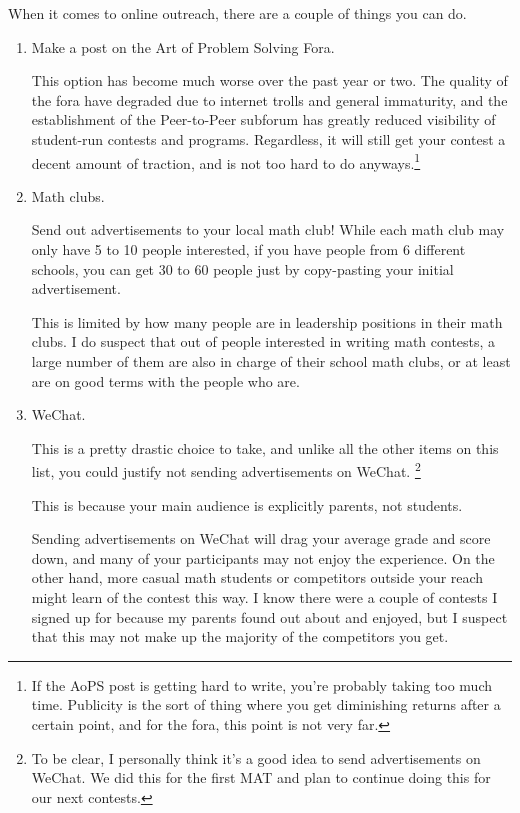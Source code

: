 \documentclass[points=false]{bounce}
\begin{document}
When it comes to online outreach, there are a couple of things you can do.
\begin{enumerate}
	\item Make a post on the Art of Problem Solving Fora.

					This option has become much worse over the past year or two. The quality of the fora have degraded due to internet trolls and general immaturity, and the establishment of the Peer-to-Peer subforum has greatly reduced visibility of student-run contests and programs. Regardless, it will still get your contest a decent amount of traction, and is not too hard to do anyways.\footnote{If the AoPS post is getting hard to write, you're probably taking too much time. Publicity is the sort of thing where you get diminishing returns after a certain point, and for the fora, this point is not very far.}

	\item Math clubs.
	
	Send out advertisements to your local math club! While each math club may only have 5 to 10 people interested, if you have people from 6 different schools, you can get 30 to 60 people just by copy-pasting your initial advertisement.

	This is limited by how many people are in leadership positions in their math clubs.
	I do suspect that out of people interested in writing math contests,
	a large number of them are also in charge of their school math clubs,
	or at least are on good terms with the people who are.

	\item WeChat.

	This is a pretty drastic choice to take, and unlike all the other items on this list,
	you could justify not sending advertisements on WeChat.
	\footnote{
		To be clear, I personally think it's a good idea to send advertisements on WeChat. We did this for the first MAT and plan to continue doing this for our next contests.
	}
	
	This is because your main audience is explicitly parents, not students.

	Sending advertisements on WeChat will drag your average grade and score down, and many of your participants may not enjoy the experience. On the other hand, more casual math students or competitors outside your reach might learn of the contest this way. I know there were a couple of contests I signed up for because my parents found out about and enjoyed, but I suspect that this may not make up the majority of the competitors you get.

\end{enumerate}
\end{document}
